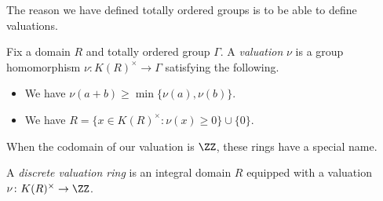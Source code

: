 \documentclass[../notes.tex]{subfiles}
\begin{document}
The reason we have defined totally ordered groups is to be able to define valuations.
\begin{definition}[Valuation]
	Fix a domain $R$ and totally ordered group $\Gamma$. A \textit{valuation} $\nu$ is a group homomorphism $\nu\colon K(R)^\times\to\Gamma$ satisfying the following.
	\begin{itemize}
		\item We have $\nu(a+b)\ge\min\{\nu(a),\nu(b)\}$.
		\item We have $R=\{x\in K(R)^\times:\nu(x)\ge0\}\cup\{0\}$.
	\end{itemize}
\end{definition}
When the codomain of our valuation is $\ZZ$, these rings have a special name.
\begin{definition}
	A \textit{discrete valuation ring} is an integral domain $R$ equipped with a valuation $\nu\colon K(R)^\times\to\ZZ$.
\end{definition}
\end{document}
